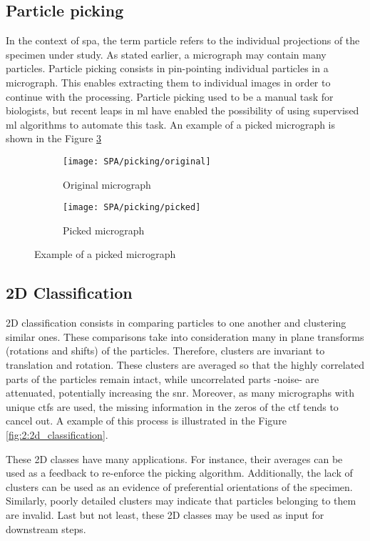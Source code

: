 \documentclass[../main.tex]{subfiles}
\begin{document}
\subsection{Particle picking}
In the context of \gls{spa}, the term particle refers to the individual projections of the specimen under study. As stated earlier, a micrograph may contain many particles. Particle picking consists in pin-pointing individual particles in a micrograph. This enables extracting them to individual images in order to continue with the processing. Particle picking used to be a manual task for biologists, but recent leaps in \gls{ml} have enabled the possibility of using supervised \gls{ml} algorithms to automate this task. An example of a picked micrograph is shown in the Figure \ref{fig:2:picking}

\begin{figure}[htbp]
    \centering
    \begin{subfigure}[b]{0.45\textwidth}
         \centering
         \texttt{[image: SPA/picking/original]}
         \caption{Original micrograph}
         \label{fig:2:picking:original}
    \end{subfigure}
    \begin{subfigure}[b]{0.45\textwidth}
         \centering
         \texttt{[image: SPA/picking/picked]}
         \caption{Picked micrograph}
         \label{fig:2:picking:picked}
    \end{subfigure}
    \caption{Example of a picked micrograph}
    \label{fig:2:picking}
\end{figure}

\subsection{2D Classification}
2D classification consists in comparing particles to one another and clustering similar ones. These comparisons take into consideration many in plane transforms (rotations and shifts) of the particles. Therefore, clusters are invariant to translation and rotation. These clusters are averaged so that the highly correlated parts of the particles remain intact, while uncorrelated parts -noise- are attenuated, potentially increasing the \gls{snr}. Moreover, as many micrographs with unique \glspl{ctf} are used, the missing information in the zeros of the \gls{ctf} tends to cancel out. A example of this process is illustrated in the Figure \ref{fig:2:2d_classification}.

These 2D classes have many applications. For instance, their averages can be used as a feedback to re-enforce the picking algorithm. Additionally, the lack of clusters can be used as an evidence of preferential orientations of the specimen. Similarly, poorly detailed clusters may indicate that particles belonging to them are invalid. Last but not least, these 2D classes may be used as input for downstream steps.
\end{document}
